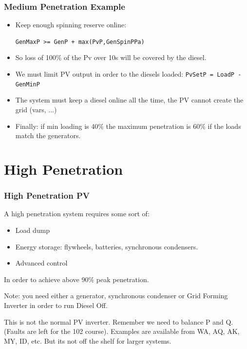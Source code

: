 \documentclass[a4paper,handout]{beamer}
\begin{document}
\begin{frame}\frametitle{Medium Penetration Example}
  \begin{itemize}
  \item Keep enough spinning reserve online: 

    \texttt{GenMaxP >= GenP + max(PvP,GenSpinPPa)}
   \pause
  \item So loss of 100\% of the Pv over 10s will be covered by the
    diesel.
    \pause
  \item We must limit PV output in order to the diesels loaded:
    \texttt{PvSetP = LoadP - GenMinP}
    \pause
  \item The system must keep a diesel online all the time,
    the PV cannot create the grid (vars, ...)
    \pause
  \item Finally: if min loading is 40\% the maximum penetration
    is 60\% if the loads match the generators.
  \end{itemize}
\end{frame}

\section{High Penetration}
\begin{frame}\frametitle{High Penetration PV}
A high penetration system requires some sort of:

\begin{itemize}
\item Load dump
\item Energy storage: flywheels, batteries, synchronous condensers.
\item Advanced control
\end{itemize}

In order to achieve above 90\% peak penetration.
\pause

Note: you need either a generator, synchronous condenser or
Grid Forming Inverter in order to run Diesel Off. 

This is not the normal 
PV inverter. Remember we need to balance P and Q.
(Faults are left for the 102 course).
\pause 
\vfill
Examples are available from WA, AQ, AK, MY, ID, etc.
\vfill
But its not off the shelf for larger systems.
\end{frame}
\end{document}
